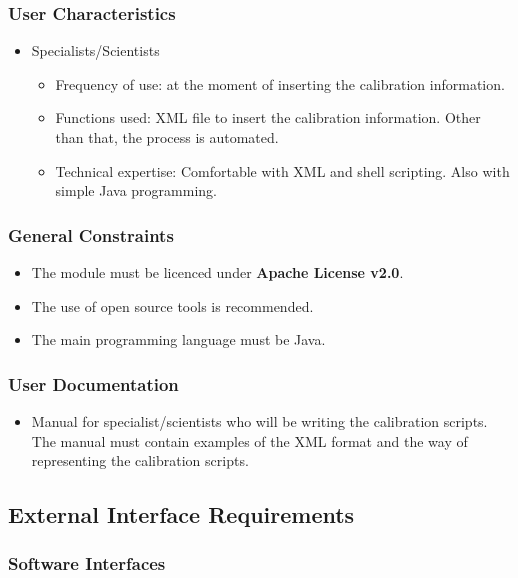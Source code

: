 \subsubsection{User Characteristics}

\begin{itemize}
\item Specialists/Scientists
\begin{itemize}
\item Frequency of use: at the moment of inserting the calibration information.
\item Functions used: XML file to insert the calibration information. Other than that, the process is automated.
\item Technical expertise: Comfortable with XML and shell scripting. Also with simple Java programming.
\end{itemize}
\end{itemize}


\subsubsection{General Constraints}

\begin{itemize}
\item The module must be licenced under \textbf{Apache License v2.0}\cite{AL20}.
\item The use of open source tools is recommended.
\item The main programming language must be Java\cite{Java}.
\end{itemize}

\subsubsection{User Documentation}
\begin{itemize}
\item Manual for specialist/scientists who will be writing the calibration scripts. The manual must contain examples of the XML format and the way of representing the calibration scripts.
\end{itemize}

\pagebreak
\subsection{External Interface Requirements}

\subsubsection{Software Interfaces}


